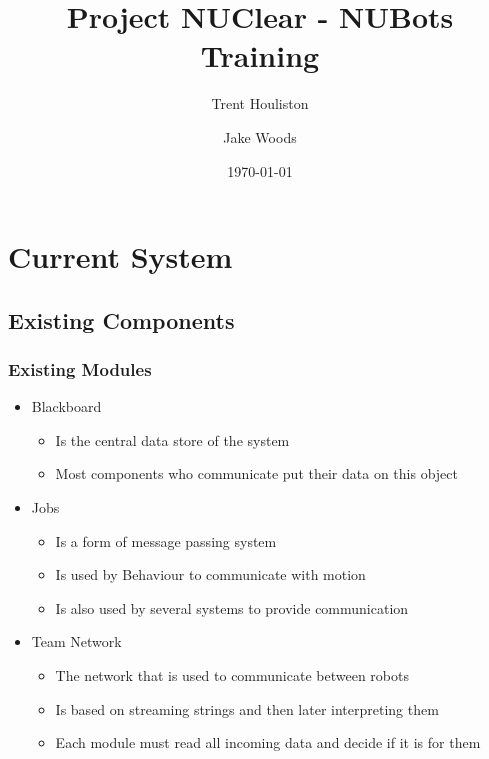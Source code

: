 \documentclass{beamer}
\title[Short title]{Project NUClear - NUBots Training}
\author{
	Trent Houliston \and Jake Woods
}
\institute[UoN]
{
	University of Newcastle \\ %
	\medskip
	\textit{Trent.Houliston@uon.edu.au, Jake.f.woods@gmail.com} %
}
\date{\today}
\begin{document}
\begin{frame}
	\titlepage %
\end{frame}


\begin{frame}
	\tableofcontents
\end{frame}

\section{Current System}
\subsection{Existing Components}
\begin{frame}
	\frametitle{Existing Modules}
	\begin{itemize}
		\item Blackboard
			\begin{itemize}
				\item Is the central data store of the system
				\item Most components who communicate put their data on this object
			\end{itemize}
		\item Jobs
			\begin{itemize}
				\item Is a form of message passing system
				\item Is used by Behaviour to communicate with motion
				\item Is also used by several systems to provide communication
			\end{itemize}
		\item Team Network
			\begin{itemize}
				\item The network that is used to communicate between robots
				\item Is based on streaming strings and then later interpreting them
				\item Each module must read all incoming data and decide if it is for them
			\end{itemize}
	\end{itemize}
\end{frame}
\end{document}
